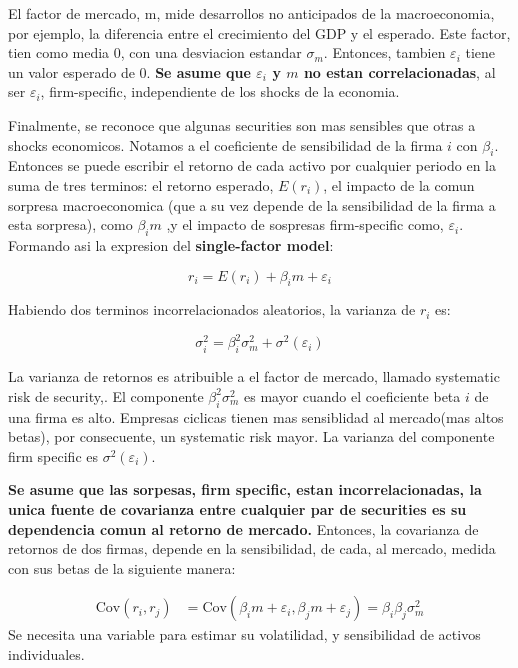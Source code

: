 \documentclass{article}
\begin{document}
El factor de mercado, m, mide desarrollos no anticipados de la macroeconomia, por ejemplo, la diferencia entre el crecimiento
del GDP y el esperado. Este factor, tien como media 0, con una desviacion estandar $\sigma_m$. Entonces, tambien $\varepsilon_i$ tiene un 
valor esperado de 0. \textbf{Se asume que $\varepsilon_i$ y $m$ no estan correlacionadas}, al ser $\varepsilon_i$, firm-specific, independiente
de los shocks de la economia.
\newpage

Finalmente, se reconoce que algunas securities son mas sensibles que otras a shocks economicos. Notamos a el coeficiente de sensibilidad 
de la firma $i$ con $\beta_i$. Entonces se puede escribir el retorno de cada activo por cualquier periodo en la suma de tres terminos:
 el retorno esperado, $E(r_i)$, el impacto de la comun sorpresa macroeconomica (que a su vez depende de la sensibilidad de la firma a 
 esta sorpresa), como $\beta_i m$ ,y el impacto de sospresas firm-specific como, $\varepsilon_i$. Formando asi la expresion del 
 \textbf{single-factor model}:

 \[
r_i = E(r_i) + \beta_i m + \varepsilon_i
\]

Habiendo dos terminos incorrelacionados aleatorios, la varianza de $r_i$ es:

\[
\sigma_i^2 = \beta_i^2 \sigma_m^2 + \sigma^2(\varepsilon_i)
\]

La varianza de retornos es atribuible a el factor de mercado, llamado systematic risk de security,. El componente $\beta_i^2 \sigma_m^2$ es mayor
cuando el coeficiente beta $i$ de una firma es alto. Empresas ciclicas tienen mas sensiblidad al mercado(mas altos betas), por consecuente, 
un systematic risk mayor. La varianza del componente firm specific es $\sigma^2(\varepsilon_i)$.

\textbf{Se asume que las sorpesas, firm specific, estan incorrelacionadas, la unica fuente de covarianza entre cualquier par de securities es
su dependencia comun al retorno de mercado.} Entonces, la covarianza de retornos de dos firmas, depende en la sensibilidad, de cada, al mercado,
medida con sus betas de la siguiente manera:

\[
\begin{aligned}
\mathrm{Cov}(r_i, r_j) &= \mathrm{Cov}(\beta_i m + \varepsilon_i, \beta_j m + \varepsilon_j) = \beta_i \beta_j \sigma_m^2
\end{aligned}
\]
Se necesita una variable para estimar su volatilidad, y sensibilidad de activos individuales.
\\
\end{document}
